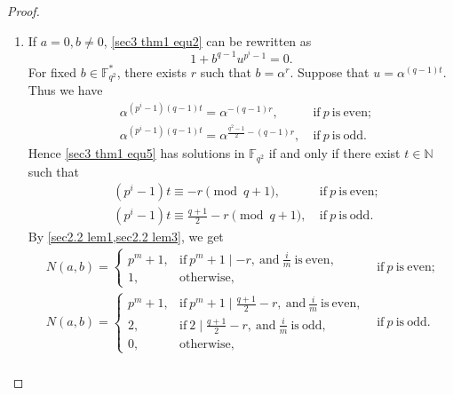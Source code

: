 \documentclass[sn-mathphys-num]{sn-jnl}%
\theoremstyle{thmstyleone}%
\theoremstyle{thmstyletwo}%
\theoremstyle{thmstylethree}%
\begin{document}
\begin{proof}
\begin{enumerate}[label = \bf Case \arabic*:, leftmargin=4.1em]
		\item If $a=0,b\ne0$, \cref{sec3 thm1 equ2} can be rewritten as
		\begin{equation}
			\label{sec3 thm1 equ5}
			1+b^{q-1}u^{p^i-1}=0.
		\end{equation}
		For fixed $b \in \mathbb{F}_{q^2}^\ast$, there exists $r$ such that $b=\alpha^r$. Suppose that $u=\alpha^{(q-1)t}$. Thus we have
		\begin{equation*}
			\begin{aligned}
				&\alpha^{(p^i-1)(q-1)t}=\alpha^{-(q-1)r},\ &\mathrm{if}\ p\ \mathrm{is\ even};\\
				&\alpha^{(p^i-1)(q-1)t}=\alpha^{\frac{q^2-1}{2}-(q-1)r},\ &\mathrm{if}\ p\ \mathrm{is\ odd}.
			\end{aligned}
		\end{equation*}
		Hence \cref{sec3 thm1 equ5} has solutions in $\mathbb{F}_{q^2}$ if and only if there exist $t\in\mathbb{N}$ such that
		\begin{equation}
			\label{sec3 thm1 equ6}
			\begin{aligned}
				&\left(p^i-1\right)t \equiv -r \pmod {q+1},\ &\mathrm{if}\ p\ \mathrm{is\ even};\\
				&\left(p^i-1\right)t \equiv \frac{q+1}{2}-r \pmod {q+1},\ &\mathrm{if}\ p\ \mathrm{is\ odd}.
			\end{aligned}
		\end{equation}
		By \cref{sec2.2 lem1,sec2.2 lem3}, we get 
		\begin{equation*}
			\begin{array}{ll}
				N(a,b)=\left\{\begin{array}{ll}
					p^m+1, &\mathrm{if}\ p^m+1\mid -r,\ \mathrm{and}\ \frac{i}{m}\ \mathrm{is\ even,}\\
					1, &\mathrm{otherwise},\end{array}\right. &\mathrm{if}\ p\ \mathrm{is\ even;}\\
				N(a,b)=\left\{\begin{array}{ll}
					p^m+1, &\mathrm{if}\ p^m+1\mid \frac{q+1}{2}-r,\ \mathrm{and}\ \frac{i}{m}\ \mathrm{is\ even,}\\
					2, &\mathrm{if}\ 2\mid \frac{q+1}{2}-r,\ \mathrm{and}\ \frac{i}{m}\ \mathrm{is\ odd},\\
					0,&\mathrm{otherwise,}\end{array}\right. &\mathrm{if}\ p\ \mathrm{is\ odd.}\\
			\end{array}
		\end{equation*}	
		

\end{enumerate}
\end{proof}
\end{document}
